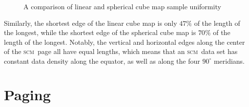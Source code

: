 \documentclass[oneside,11pt]{memoir}
\newcommand{\scm}     {\textsc{scm}}
\begin{document}
\begin{Spacing}{1.1}
\begin{figure}
  \centering
  \hfil
  \hfil
  \caption{A comparison of linear and spherical cube map sample uniformity}
  \label{fig:uniformity}
\end{figure}

Similarly, the shortest edge of the linear cube map is only $47\%$ of the length of the longest, while the shortest edge of the spherical cube map is $70\%$ of the length of the longest.  Notably, the vertical and horizontal edges along the center of the \scm\ page all have equal lengths, which means that an \scm\ data set has constant data density along the equator, as well as along the four $90^\circ$ meridians.

\section{Paging}


\end{Spacing}
\end{document}
